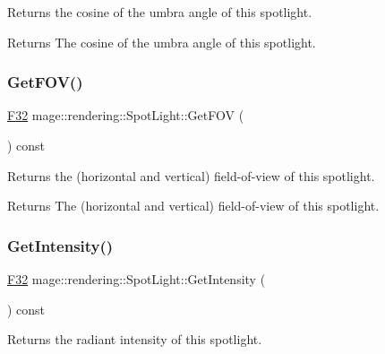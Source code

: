 Returns the cosine of the umbra angle of this spotlight.

\begin{DoxyReturn}{Returns}
The cosine of the umbra angle of this spotlight. 
\end{DoxyReturn}
\hypertarget{classmage_1_1rendering_1_1_spot_light_a22527d940bc7601285429b36e8d97490}{}\label{classmage_1_1rendering_1_1_spot_light_a22527d940bc7601285429b36e8d97490} 
\subsubsection{\texorpdfstring{Get\+F\+O\+V()}{GetFOV()}}
{\footnotesize\ttfamily \hyperlink{namespacemage_aa97e833b45f06d60a0a9c4fc22ae02c0}{F32} mage\+::rendering\+::\+Spot\+Light\+::\+Get\+F\+OV (\begin{DoxyParamCaption}{ }\end{DoxyParamCaption}) const\hspace{0.3cm}{\ttfamily [noexcept]}}

Returns the (horizontal and vertical) field-\/of-\/view of this spotlight.

\begin{DoxyReturn}{Returns}
The (horizontal and vertical) field-\/of-\/view of this spotlight. 
\end{DoxyReturn}
\hypertarget{classmage_1_1rendering_1_1_spot_light_ac3fe64c6d599149cf569693f74ac41e8}{}\label{classmage_1_1rendering_1_1_spot_light_ac3fe64c6d599149cf569693f74ac41e8} 
\subsubsection{\texorpdfstring{Get\+Intensity()}{GetIntensity()}}
{\footnotesize\ttfamily \hyperlink{namespacemage_aa97e833b45f06d60a0a9c4fc22ae02c0}{F32} mage\+::rendering\+::\+Spot\+Light\+::\+Get\+Intensity (\begin{DoxyParamCaption}{ }\end{DoxyParamCaption}) const\hspace{0.3cm}{\ttfamily [noexcept]}}

Returns the radiant intensity of this spotlight.

